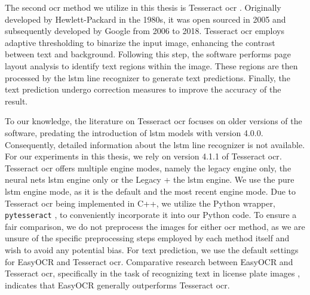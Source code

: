 The second \gls{ocr} method we utilize in this thesis is Tesseract \gls{ocr} \cite{tesseract_legacy_2007}\cite{tesseract_github_2023}\cite{tesseract_architecture_2016}.
Originally developed by Hewlett-Packard in the 1980s, it was open sourced in 2005 and subsequently developed by Google from 2006 to 2018.
Tesseract \gls{ocr} employs adaptive thresholding to binarize the input image, enhancing the contrast between text and background.
Following this step, the software performs page layout analysis to identify text regions within the image.
These regions are then processed by the \gls{lstm} line recognizer to generate text predictions.
Finally, the text prediction undergo correction measures to improve the accuracy of the result.

To our knowledge, the literature on Tesseract \gls{ocr} focuses on older versions of the software, predating the introduction of \gls{lstm} models with version 4.0.0.
Consequently, detailed information about the \gls{lstm} line recognizer is not available.
For our experiments in this thesis, we rely on version 4.1.1 of Tesseract \gls{ocr}.
Tesseract \gls{ocr} offers multiple engine modes, namely the legacy engine only, the neural nets \gls{lstm} engine only or the Legacy + the \gls{lstm} engine.
We use the pure \gls{lstm} engine mode, as it is the default and the most recent engine mode.
Due to Tesseract \gls{ocr} being implemented in C++, we utilize the Python wrapper, \texttt{pytesseract} \cite{pytesseract_2022}, to conveniently incorporate it into our Python code.
To ensure a fair comparison, we do not preprocess the images for either \gls{ocr} method, as we are unsure of the specific preprocessing steps employed by each method itself and wish to avoid any potential bias.
For text prediction, we use the default settings for EasyOCR and Tesseract \gls{ocr}.
Comparative research between EasyOCR and Tesseract \gls{ocr}, specifically in the task of recognizing text in license plate images \cite{ocr_tess_vs_easyocr_2022}, indicates that EasyOCR generally outperforms Tesseract \gls{ocr}.


